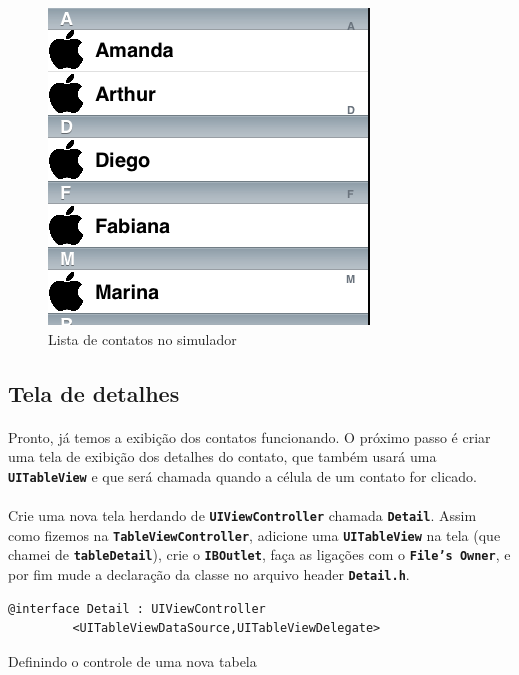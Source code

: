 \documentclass[a4paper,12pt,brazil,doubleside]{book}
\begin{document}
\begin{singlespace}
\begin{figure}[H]
  \centering
  \includegraphics[totalheight=0.3\textheight]{figuras/table/table3.png}
  \caption{Lista de contatos no simulador}
  \label{fig:a}
\end{figure}

\subsection{Tela de detalhes}

\paragraph{}Pronto, já temos a exibição dos contatos funcionando. O próximo passo é criar uma tela de exibição dos detalhes do contato, que também usará uma \texttt{\textbf{UITableView}} e que será chamada quando a célula de um contato for clicado.
\paragraph{}Crie uma nova tela herdando de \texttt{\textbf{UIViewController}} chamada \texttt{\textbf{Detail}}. Assim como fizemos na \texttt{\textbf{TableViewController}}, adicione uma \texttt{\textbf{UITableView}} na tela (que chamei de \texttt{\textbf{tableDetail}}), crie o \texttt{\textbf{IBOutlet}}, faça as ligações com o \texttt{\textbf{File's Owner}}, e por fim mude a declaração da classe no arquivo header \texttt{\textbf{Detail.h}}.

\begin{listing}[H]
\begin{verbatim}
@interface Detail : UIViewController
         <UITableViewDataSource,UITableViewDelegate>
\end{verbatim}
\caption{Definindo o controle de uma nova tabela}
\end{listing}


\end{singlespace}
\end{document}
